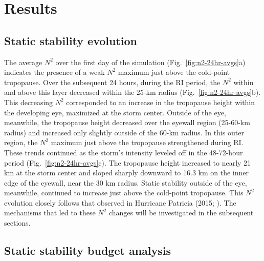 \documentclass{ametsoc}
\begin{document}
 \section{Results}

 \subsection{Static stability evolution}

The average $N^2$ over the first day of the simulation (Fig.~\ref{fig:n2-24hr-avgs}a) indicates the presence of a weak $N^2$ maximum just above the cold-point tropopause.
Over the subsequent 24 hours, during the RI period, the $N^2$ within and above this layer decreased within the 25-km radius (Fig.~\ref{fig:n2-24hr-avgs}b).
This decreasing $N^2$ corresponded to an increase in the tropopause height within the developing eye, maximized at the storm center.
Outside of the eye, meanwhile, the tropopause height decreased over the eyewall region (25-60-km radius) and increased only slightly outside of the 60-km radius.
In this outer region, the $N^2$ maximum just above the tropopause strengthened during RI.
These trends continued as the storm's intensity leveled off in the 48-72-hour period (Fig.~\ref{fig:n2-24hr-avgs}c).
The tropopause height increased to nearly 21 km at the storm center and sloped sharply downward to 16.3 km on the inner edge of the eyewall, near the 30 km radius.
Static stability outside of the eye, meanwhile, continued to increase just above the cold-point tropopause.
This $N^2$ evolution closely follows that observed in Hurricane Patricia (2015; \citeauthor{DuranMolinari2018} \citeyear{DuranMolinari2018}).
The mechanisms that led to these $N^2$ changes will be investigated in the subsequent sections.

 \subsection{Static stability budget analysis}
\end{document}
